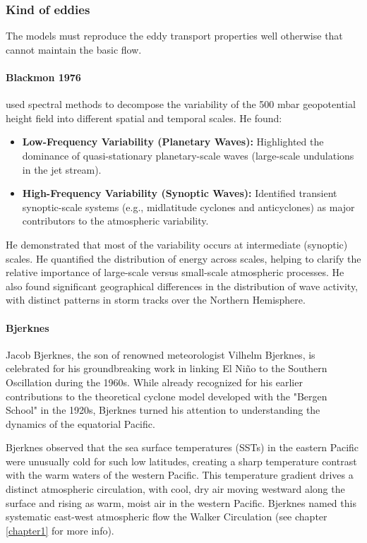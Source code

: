 \subsubsection{Kind of eddies}
The models must reproduce the eddy transport properties well otherwise that cannot maintain the basic flow. 
\paragraph{Blackmon 1976}\cite{M.L.Blackmon1976}  used spectral methods to decompose the variability of the 500 mbar geopotential height field into different spatial and temporal scales. He found:
\begin{itemize}
    \item \textbf{Low-Frequency Variability (Planetary Waves):} Highlighted the dominance of quasi-stationary planetary-scale waves (large-scale undulations in the jet stream).
    \item \textbf{High-Frequency Variability (Synoptic Waves):} Identified transient synoptic-scale systems (e.g., midlatitude cyclones and anticyclones) as major contributors to the atmospheric variability.
\end{itemize}
He demonstrated that most of the variability occurs at intermediate (synoptic) scales. He quantified the distribution of energy across scales, helping to clarify the relative importance of large-scale versus small-scale atmospheric processes. He also found significant geographical differences in the distribution of wave activity, with distinct patterns in storm tracks over the Northern Hemisphere. 

\paragraph{Bjerknes} Jacob Bjerknes, the son of renowned meteorologist Vilhelm Bjerknes, is celebrated for his groundbreaking work in linking El Niño to the Southern Oscillation during the 1960s. While already recognized for his earlier contributions to the theoretical cyclone model developed with the "Bergen School" in the 1920s, Bjerknes turned his attention to understanding the dynamics of the equatorial Pacific.

Bjerknes observed that the sea surface temperatures (SSTs) in the eastern Pacific were unusually cold for such low latitudes, creating a sharp temperature contrast with the warm waters of the western Pacific. This temperature gradient drives a distinct atmospheric circulation, with cool, dry air moving westward along the surface and rising as warm, moist air in the western Pacific. Bjerknes named this systematic east-west atmospheric flow the Walker Circulation (see chapter \ref{chapter1} for more info).

